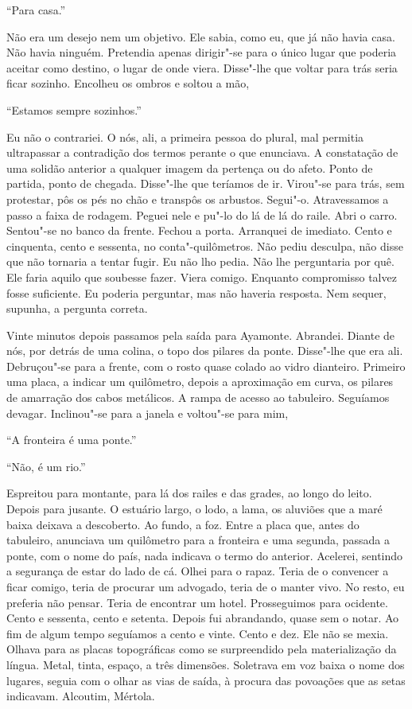 ``Para casa.''

Não era um desejo nem um objetivo. Ele sabia, como eu, que já não havia
casa. Não havia ninguém. Pretendia apenas dirigir"-se para o único lugar
que poderia aceitar como destino, o lugar de onde viera. Disse"-lhe que
voltar para trás seria ficar sozinho. Encolheu os ombros e soltou a mão,

``Estamos sempre sozinhos.''

Eu não o contrariei. O nós, ali, a primeira pessoa do plural, mal
permitia ultrapassar a contradição dos termos perante o que enunciava. A
constatação de uma solidão anterior a qualquer imagem da pertença ou do
afeto. Ponto de partida, ponto de chegada. Disse"-lhe que teríamos de
ir. Virou"-se para trás, sem protestar, pôs os pés no chão e transpôs os
arbustos. Segui"-o. Atravessamos a passo a faixa de rodagem. Peguei nele
e pu"-lo do lá de lá do raile. Abri o carro. Sentou"-se no banco da
frente. Fechou a porta. Arranquei de imediato. Cento e cinquenta, cento
e sessenta, no conta"-quilômetros. Não pediu desculpa, não disse que não
tornaria a tentar fugir. Eu não lho pedia. Não lhe perguntaria por quê.
Ele faria aquilo que soubesse fazer. Viera comigo. Enquanto compromisso
talvez fosse suficiente. Eu poderia perguntar, mas não haveria resposta.
Nem sequer, supunha, a pergunta correta.

Vinte minutos depois passamos pela saída para Ayamonte. Abrandei. Diante
de nós, por detrás de uma colina, o topo dos pilares da ponte.
Disse"-lhe que era ali. Debruçou"-se para a frente, com o rosto quase
colado ao vidro dianteiro. Primeiro uma placa, a indicar um quilômetro,
depois a aproximação em curva, os pilares de amarração dos cabos
metálicos. A rampa de acesso ao tabuleiro. Seguíamos devagar.
Inclinou"-se para a janela e voltou"-se para mim,

``A fronteira é uma ponte.''

``Não, é um rio.''

Espreitou para montante, para lá dos railes e das grades, ao longo do
leito. Depois para jusante. O estuário largo, o lodo, a lama, os
aluviões que a maré baixa deixava a descoberto. Ao fundo, a foz. Entre a
placa que, antes do tabuleiro, anunciava um quilômetro para a fronteira
e uma segunda, passada a ponte, com o nome do país, nada indicava o
termo do anterior. Acelerei, sentindo a segurança de estar do lado de
cá. Olhei para o rapaz. Teria de o convencer a ficar comigo, teria de
procurar um advogado, teria de o manter vivo. No resto, eu preferia não
pensar. Teria de encontrar um hotel. Prosseguimos para ocidente. Cento e
sessenta, cento e setenta. Depois fui abrandando, quase sem o notar. Ao
fim de algum tempo seguíamos a cento e vinte. Cento e dez. Ele não se
mexia. Olhava para as placas topográficas como se surpreendido pela
materialização da língua. Metal, tinta, espaço, a três dimensões.
Soletrava em voz baixa o nome dos lugares, seguia com o olhar as vias de
saída, à procura das povoações que as setas indicavam. Alcoutim,
Mértola.

